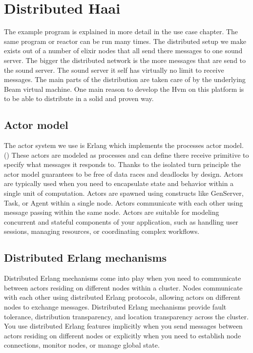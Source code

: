 \documentclass[a4paper]{book}
\begin{document}
\chapter{Distributed Haai}
The example program is explained in more detail in the use case chapter. The same program or reactor can be run many times. The distributed setup we make exists out of a number of elixir nodes that all send there messages to one sound server. The bigger the distributed network is the more messages that are send to the sound server. The sound server it self has virtually no limit to receive messages. The main parts of the distribution are taken care of by the underlying Beam virtual machine. One main reason to develop the Hvm on this platform is to be able to distribute in a solid and proven way.  

\section{Actor model}
The actor system we use is Erlang which implements the processes actor model. (\cite{de_koster_43_2016}) These actors are modeled as processes and can define there receive primitive to specify what messages it responds to. Thanks to the isolated turn principle the actor model guarantees to be free of data races and deadlocks by design.
    Actors are typically used when you need to encapsulate state and behavior within a single unit of computation.
Actors are spawned using constructs like GenServer, Task, or Agent within a single node.
Actors communicate with each other using message passing within the same node.
Actors are suitable for modeling concurrent and stateful components of your application, such as handling user sessions, managing resources, or coordinating complex workflows.

\section{Distributed Erlang mechanisms}
    Distributed Erlang mechanisms come into play when you need to communicate between actors residing on different nodes within a cluster.
Nodes communicate with each other using distributed Erlang protocols, allowing actors on different nodes to exchange messages.
Distributed Erlang mechanisms provide fault tolerance, distribution transparency, and location transparency across the cluster.
You use distributed Erlang features implicitly when you send messages between actors residing on different nodes or explicitly when you need to establish node connections, monitor nodes, or manage global state.
\end{document}
